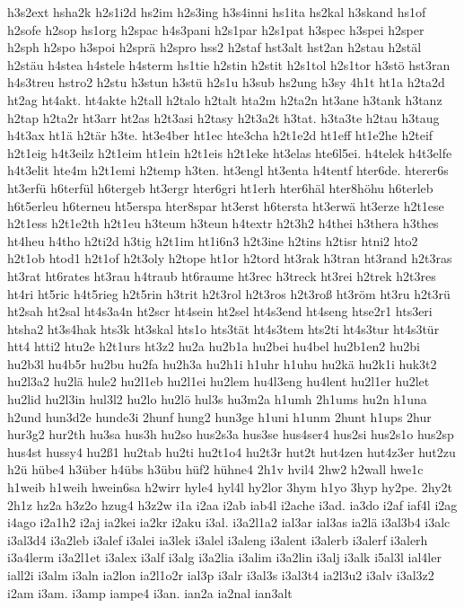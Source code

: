 {h3s2ext
hsha2k
h2s1i2d
hs2im
h2s3ing
h3s4inni
hs1ita
hs2kal
h3skand
hs1of
h2sofe
h2sop
hs1org
h2spac
h4s3pani
h2s1par
h2s1pat
h3spec
h3spei
h2sper
h2sph
h2spo
h3spoi
h2sprä
h2spro
hss2
h2staf
hst3alt
hst2an
h2stau
h2stäl
h2stäu
h4stea
h4stele
h4sterm
hs1tie
h2stin
h2stit
h2s1tol
h2s1tor
h3stö
hst3ran
h4s3treu
hstro2
h2stu
h3stun
h3stü
h2s1u
h3sub
hs2ung
h3sy
4h1t
ht1a
h2ta2d
ht2ag
ht4akt.
ht4akte
h2tall
h2talo
h2talt
hta2m
h2ta2n
ht3ane
h3tank
h3tanz
h2tap
h2ta2r
ht3arr
ht2as
h2t3asi
h2tasy
h2t3a2t
h3tat.
h3ta3te
h2tau
h3taug
h4t3ax
ht1ä
h2tär
h3te.
ht3e4ber
ht1ec
hte3cha
h2t1e2d
ht1eff
ht1e2he
h2teif
h2t1eig
h4t3eilz
h2t1eim
ht1ein
h2t1eis
h2t1eke
ht3elas
hte6l5ei.
h4telek
h4t3elfe
h4t3elit
hte4m
h2t1emi
h2temp
h3ten.
ht3engl
ht3enta
h4tentf
hter6de.
hterer6s
ht3erfü
h6terfül
h6tergeb
ht3ergr
hter6gri
ht1erh
hter6häl
hter8höhu
h6terleb
h6t5erleu
h6terneu
ht5erspa
hter8spar
ht3erst
h6tersta
ht3erwä
ht3erze
h2t1ese
h2t1ess
h2t1e2th
h2t1eu
h3teum
h3teun
h4textr
h2t3h2
h4thei
h3thera
h3thes
ht4heu
h4tho
h2ti2d
h3tig
h2t1im
ht1i6n3
h2t3ine
h2tins
h2tisr
htni2
hto2
h2t1ob
htod1
h2t1of
h2t3oly
h2tope
ht1or
h2tord
ht3rak
h3tran
ht3rand
h2t3ras
ht3rat
ht6rates
ht3rau
h4traub
ht6raume
ht3rec
h3treck
ht3rei
h2trek
h2t3res
ht4ri
ht5ric
h4t5rieg
h2t5rin
h3trit
h2t3rol
h2t3ros
h2t3roß
ht3röm
ht3ru
h2t3rü
ht2sah
ht2sal
ht4s3a4n
ht2scr
ht4sein
ht2sel
ht4s3end
ht4seng
htse2r1
hts3eri
htsha2
ht3s4hak
hts3k
ht3skal
hts1o
hts3tät
ht4s3tem
hts2ti
ht4s3tur
ht4s3tür
htt4
htti2
htu2e
h2t1urs
ht3z2
hu2a
hu2b1a
hu2bei
hu4bel
hu2b1en2
hu2bi
hu2b3l
hu4b5r
hu2bu
hu2fa
hu2h3a
hu2h1i
h1uhr
h1uhu
hu2kä
hu2k1i
huk3t2
hu2l3a2
hu2lä
hule2
hu2l1eb
hu2l1ei
hu2lem
hu4l3eng
hu4lent
hu2l1er
hu2let
hu2lid
hu2l3in
hul3l2
hu2lo
hu2lö
hul3s
hu3m2a
h1umh
2h1ums
hu2n
h1una
h2und
hun3d2e
hunde3i
2hunf
hung2
hun3ge
h1uni
h1unm
2hunt
h1ups
2hur
hur3g2
hur2th
hu3sa
hus3h
hu2so
hus2s3a
hus3se
hus4ser4
hus2si
hus2s1o
hus2sp
hus4st
hussy4
hu2ß1
hu2tab
hu2ti
hu2t1o4
hu2t3r
hut2t
hut4zen
hut4z3er
hut2zu
h2ü
hübe4
h3über
h4übs
h3übu
hüf2
hühne4
2h1v
hvil4
2hw2
h2wall
hwe1c
h1weib
h1weih
hwein6sa
h2wirr
hyle4
hyl4l
hy2lor
3hym
h1yo
3hyp
hy2pe.
2hy2t
2h1z
hz2a
h3z2o
hzug4
h3z2w
i1a
i2aa
i2ab
iab4l
i2ache
i3ad.
ia3do
i2af
iaf4l
i2ag
i4ago
i2a1h2
i2aj
ia2kei
ia2kr
i2aku
i3al.
i3a2l1a2
ial3ar
ial3as
ia2lä
i3al3b4
i3alc
i3al3d4
i3a2leb
i3alef
i3alei
ia3lek
i3alel
i3aleng
i3alent
i3alerb
i3alerf
i3alerh
i3a4lerm
i3a2l1et
i3alex
i3alf
i3alg
i3a2lia
i3alim
i3a2lin
i3alj
i3alk
i5al3l
ial4ler
iall2i
i3alm
i3aln
ia2lon
ia2l1o2r
ial3p
i3alr
i3al3s
i3al3t4
ia2l3u2
i3alv
i3al3z2
i2am
i3am.
i3amp
iampe4
i3an.
ian2a
ia2nal
ian3alt
}
